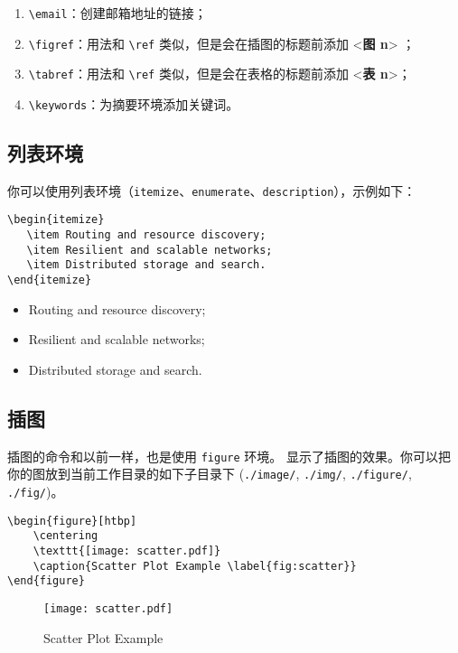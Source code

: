 \documentclass[lang=cn,11pt]{elegantpaper}
\begin{document}
\begin{enumerate}
	\item \lstinline{\email}：创建邮箱地址的链接；
	\item \lstinline{\figref}：用法和 \lstinline{\ref} 类似，但是会在插图的标题前添加 <\textbf{图 n}> ；
	\item \lstinline{\tabref}：用法和 \lstinline{\ref} 类似，但是会在表格的标题前添加 <\textbf{表 n}>；
	\item \lstinline{\keywords}：为摘要环境添加关键词。
\end{enumerate}

\subsection{列表环境}
你可以使用列表环境（\lstinline{itemize}、\lstinline{enumerate}、\lstinline{description}），示例如下：\\[2ex]
\begin{minipage}[c]{0.59\linewidth}
\begin{lstlisting}
\begin{itemize}
   \item Routing and resource discovery;
   \item Resilient and scalable networks; 
   \item Distributed storage and search.
\end{itemize}
\end{lstlisting}
\end{minipage}
\begin{minipage}[c]{0.4\linewidth}
\begin{itemize}
   \item Routing and resource discovery;
   \item Resilient and scalable networks;
   \item Distributed storage and search.
\end{itemize}
\end{minipage}




\subsection{插图}
插图的命令和以前一样，也是使用 \lstinline{figure} 环境。 显示了插图的效果。你可以把你的图放到当前工作目录的如下子目录下 (\lstinline{./image/}, \lstinline{./img/}, \lstinline{./figure/}, \lstinline{./fig/})。


\begin{lstlisting}
\begin{figure}[htbp]
	\centering
	\texttt{[image: scatter.pdf]}
	\caption{Scatter Plot Example \label{fig:scatter}}
\end{figure}
\end{lstlisting}
\begin{figure}[htbp]
	\centering
	\texttt{[image: scatter.pdf]}
	\caption{Scatter Plot Example \label{fig:scatter}}
\end{figure}
\end{document}
